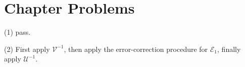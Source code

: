 \section*{Chapter Problems}

\prob (1) pass.

(2) First apply $\mathcal{V}^{-1}$, then apply the error-correction procedure for $\mathcal{E}_1$, finally apply $\mathcal{U}^{-1}$.

\prob \todo

\prob \todo

\prob \todo

\prob \todo